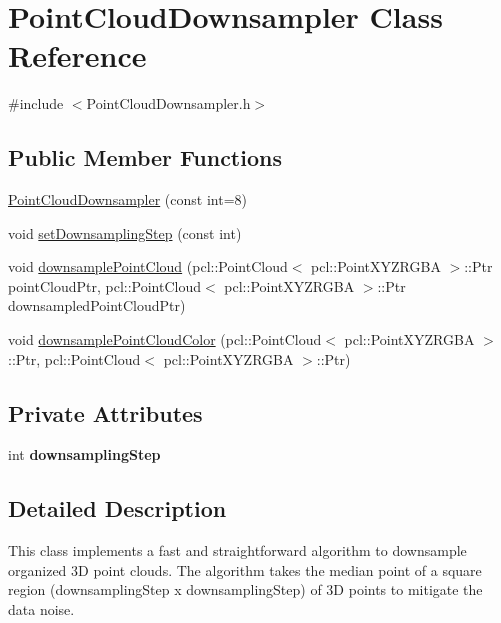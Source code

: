 \hypertarget{class_point_cloud_downsampler}{
\section{PointCloudDownsampler Class Reference}
\label{class_point_cloud_downsampler}
}


{\ttfamily \#include $<$PointCloudDownsampler.h$>$}

\subsection*{Public Member Functions}
\begin{DoxyCompactItemize}
\item 
\hyperlink{class_point_cloud_downsampler_a518e890b357eed74601e0fc940334343}{PointCloudDownsampler} (const int=8)
\item 
void \hyperlink{class_point_cloud_downsampler_aa59d5affe32288f96dd2ac1ff46aab35}{setDownsamplingStep} (const int)
\item 
void \hyperlink{class_point_cloud_downsampler_a6c2648119f30b8c41c5851844c1acb29}{downsamplePointCloud} (pcl::PointCloud$<$ pcl::PointXYZRGBA $>$::Ptr pointCloudPtr, pcl::PointCloud$<$ pcl::PointXYZRGBA $>$::Ptr downsampledPointCloudPtr)
\item 
void \hyperlink{class_point_cloud_downsampler_aa974584d15d1de898bbec8dbf791b29f}{downsamplePointCloudColor} (pcl::PointCloud$<$ pcl::PointXYZRGBA $>$::Ptr, pcl::PointCloud$<$ pcl::PointXYZRGBA $>$::Ptr)
\end{DoxyCompactItemize}
\subsection*{Private Attributes}
\begin{DoxyCompactItemize}
\item 
\hypertarget{class_point_cloud_downsampler_a74b48c9180a5d63ab550e26f07c24df0}{
int {\bfseries downsamplingStep}}
\label{class_point_cloud_downsampler_a74b48c9180a5d63ab550e26f07c24df0}

\end{DoxyCompactItemize}


\subsection{Detailed Description}
This class implements a fast and straightforward algorithm to downsample organized 3D point clouds. The algorithm takes the median point of a square region (downsamplingStep x downsamplingStep) of 3D points to mitigate the data noise. 

